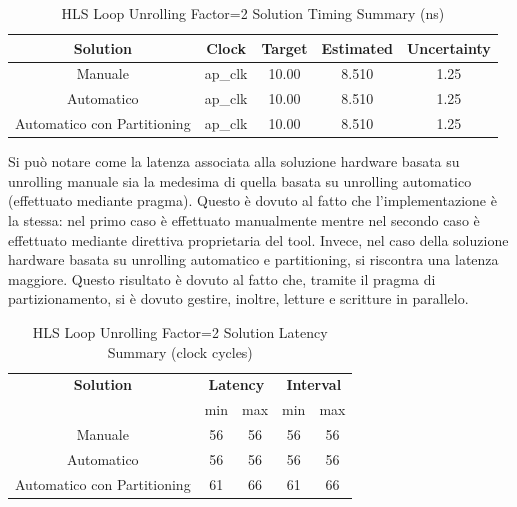



\begin{table}[H]
    \centering
    \begin{tabular}{|c|c|c|c|c|}
        \hline
        \textbf{Solution} & \textbf{Clock} & \textbf{Target} & \textbf{Estimated} & \textbf{Uncertainty} \\
        \hline
        Manuale & ap\_clk & 10.00 & 8.510 & 1.25 \\
        \hline
        Automatico & ap\_clk & 10.00 & 8.510 & 1.25 \\
        \hline
        Automatico con Partitioning & ap\_clk & 10.00 & 8.510 & 1.25 \\
        \hline
    \end{tabular}
    \caption{HLS Loop Unrolling Factor=2 Solution Timing Summary (ns)}
    \label{tab:hls-loop-unrolling-factor2-solution-timing-summary}
\end{table}

Si può notare come la latenza associata alla soluzione hardware basata su unrolling manuale sia la medesima di quella basata su unrolling automatico (effettuato mediante pragma). Questo è dovuto al fatto che l'implementazione è la stessa: nel primo caso è effettuato manualmente mentre nel secondo caso è effettuato mediante direttiva proprietaria del tool. Invece, nel caso della soluzione hardware basata su unrolling automatico e partitioning, si riscontra una latenza maggiore. Questo risultato è dovuto al fatto che, tramite il pragma di partizionamento, si è dovuto gestire, inoltre, letture e scritture in parallelo.

\begin{table}[H]
    \centering
    \begin{tabular}{|c|c|c|c|c|}
        \hline
        \multicolumn{1}{|c|}{\textbf{Solution}} & \multicolumn{2}{|c|}{\textbf{Latency}} & \multicolumn{2}{|c|}{\textbf{Interval}} \\
        & min & max & min & max \\
        \hline
        Manuale & 56 & 56 & 56 & 56 \\
        \hline
        Automatico & 56 & 56 & 56 & 56 \\
        \hline
        Automatico con Partitioning & 61 & 66 & 61 & 66 \\
        \hline
    \end{tabular}
    \caption{HLS Loop Unrolling Factor=2 Solution Latency Summary (clock cycles)}
    \label{tab:hls-loop-unrolling-factor2-solution-latency-summary}
\end{table}

